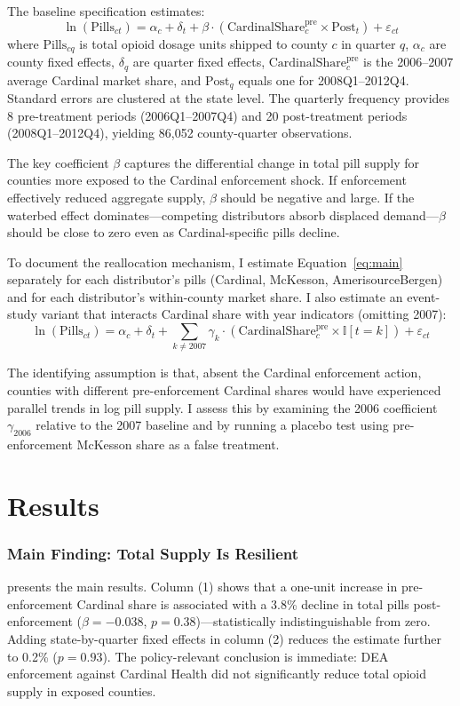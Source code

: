 \documentclass[12pt]{article}
\newcommand{\ind}{\mathbb{I}}
\begin{document}
The baseline specification estimates:
\begin{equation}\label{eq:main}
\ln(\text{Pills}_{ct}) = \alpha_c + \delta_t + \beta \cdot (\text{CardinalShare}_{c}^{\text{pre}} \times \text{Post}_t) + \varepsilon_{ct}
\end{equation}
where $\text{Pills}_{cq}$ is total opioid dosage units shipped to county $c$ in quarter $q$, $\alpha_c$ are county fixed effects, $\delta_q$ are quarter fixed effects, $\text{CardinalShare}_{c}^{\text{pre}}$ is the 2006--2007 average Cardinal market share, and $\text{Post}_q$ equals one for 2008Q1--2012Q4. Standard errors are clustered at the state level. The quarterly frequency provides 8 pre-treatment periods (2006Q1--2007Q4) and 20 post-treatment periods (2008Q1--2012Q4), yielding 86,052 county-quarter observations.

The key coefficient $\beta$ captures the differential change in total pill supply for counties more exposed to the Cardinal enforcement shock. If enforcement effectively reduced aggregate supply, $\beta$ should be negative and large. If the waterbed effect dominates---competing distributors absorb displaced demand---$\beta$ should be close to zero even as Cardinal-specific pills decline.

To document the reallocation mechanism, I estimate Equation~\ref{eq:main} separately for each distributor's pills (Cardinal, McKesson, AmerisourceBergen) and for each distributor's within-county market share. I also estimate an event-study variant that interacts Cardinal share with year indicators (omitting 2007):
\begin{equation}\label{eq:event}
\ln(\text{Pills}_{ct}) = \alpha_c + \delta_t + \sum_{k \neq 2007} \gamma_k \cdot (\text{CardinalShare}_{c}^{\text{pre}} \times \ind[t = k]) + \varepsilon_{ct}
\end{equation}

The identifying assumption is that, absent the Cardinal enforcement action, counties with different pre-enforcement Cardinal shares would have experienced parallel trends in log pill supply. I assess this by examining the 2006 coefficient $\gamma_{2006}$ relative to the 2007 baseline and by running a placebo test using pre-enforcement McKesson share as a false treatment.

\section{Results}

\subsubsection*{Main Finding: Total Supply Is Resilient}
 presents the main results. Column (1) shows that a one-unit increase in pre-enforcement Cardinal share is associated with a 3.8\% decline in total pills post-enforcement ($\beta = -0.038$, $p = 0.38$)---statistically indistinguishable from zero. Adding state-by-quarter fixed effects in column (2) reduces the estimate further to 0.2\% ($p = 0.93$). The policy-relevant conclusion is immediate: DEA enforcement against Cardinal Health did not significantly reduce total opioid supply in exposed counties.
\end{document}
